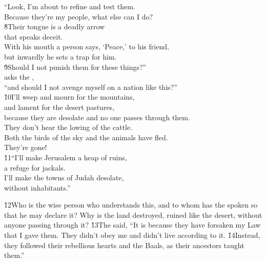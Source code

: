 \begin{poetry}
\poeml ``Look, I'm about to refine and test them. \\
\poemll    Because they're my people, what else can I do? \\
\poeml \v{8}Their tongue is a deadly arrow \\
\poemll    that speaks deceit. \\
\poeml With his mouth a person says, `Peace,' to his friend, \\
\poemll    but inwardly he sets a trap for him. \\
\poeml \v{9}Should I not punish them for these things?'' \\
\poemll    asks the , \\
\poemlll       ``and should I not avenge myself on a nation like this?'' \\
\poeml \v{10}I'll weep and mourn for the mountains, \\
\poemll    and lament for the desert pastures, \\
\poeml because they are desolate and no one passes through them. \\
\poemll    They don't hear the lowing of the cattle. \\
\poeml Both the birds of the sky and the animals have fled. \\
\poemll    They're gone! \\
\poeml \v{11}``I'll make Jerusalem a heap of ruins, \\
\poemll    a refuge for jackals. \\
\poeml I'll make the towns of Judah desolate, \\
\poemll    without inhabitants.''
\end{poetry}

\v{12}Who is the wise person who understands this, and to whom has the  spoken so that he may declare it? Why is the land destroyed, ruined like the desert, without anyone passing through it? \v{13}The  said, ``It is because they have forsaken my Law that I gave them. They didn't obey me and didn't live according to it. \v{14}Instead, they followed their rebellious hearts and the Baals, as their ancestors taught them.''

